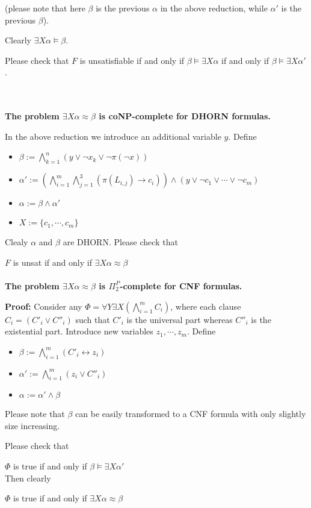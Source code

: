 \documentclass[12pt]{article}
\begin{document}
(please note that here $\beta$ is the previous $\alpha$ in the above reduction, while $\alpha'$ is the previous $\beta$).

Clearly $\exists X\alpha\models \beta$.

Please check that $F$ is unsatisfiable if and only if $\beta\models\exists X\alpha$ if and only if $\beta\models \exists X\alpha'$.

\ \\ \\

{\bf The problem $\exists X\alpha\approx\beta$ is coNP-complete for DHORN formulas.}

In the above reduction we introduce an additional variable $y$. Define 

\begin{itemize}
\item $\beta:=\bigwedge_{k=1}^{n} (y\vee \neg x_k\vee \neg \pi(\neg x))$

\item $\alpha':= \left(\bigwedge_{i=1}^{m}\bigwedge_{j=1}^{3}\left(\pi(L_{i,j})\rightarrow c_i\right)\right)\wedge (y\vee \neg c_1\vee\cdots\vee\neg c_m)$

\item $\alpha:=\beta\wedge \alpha'$

\item $X:=\{c_1,\cdots,c_m\}$
\end{itemize}
Clealy $\alpha$ and $\beta$ are DHORN. 
Please check that 

$F$ is unsat if and only if $\exists X\alpha\approx\beta$\\ \\


{\bf The problem $\exists X\alpha\approx \beta$ is $\Pi_2^P$-complete for CNF formulas. }

{\bf Proof:} Consider any $\Phi=\forall Y\exists X \left(\bigwedge_{i=1}^m C_i\right)$, where each clause $C_i=(C'_i\vee C''_i)$ such that $C'_i$ is the universal part whereas $C''_i$ is the existential part. Introduce new variables $z_1,\cdots,z_m$. Define

\begin{itemize}
\item $\beta:=\bigwedge_{i=1}^m(C'_i\leftrightarrow z_i)$

\item $\alpha':=\bigwedge_{i=1}^m(z_i\vee C''_i)$

\item $\alpha:=\alpha'\wedge \beta$
\end{itemize}

Please note that $\beta$ can be easily transformed to a CNF formula with only slightly size increasing. 

   
Please check that 

$\Phi$ is true if and only if $\beta\models \exists X\alpha'$\\

Then clearly 

$\Phi$ is true if and only if $\exists X\alpha\approx \beta$\\
\end{document}
